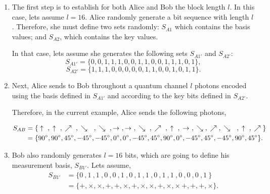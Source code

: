 \begin{enumerate}
  \item The first step is to establish for both Alice and Bob the block length $l$. In this case, lets assume $l=16$. Alice randomly generate a bit sequence with length $l$.
      Therefore, she must define two sets randomly: $S_{A1}$ which contains the basis values; and $S_{A2}$, which contains the key values.

      In that case, lets assume she generates the following sets $S_{A1'}$ and $S_{A2'}$:
      $$S_{A1'} = \{0,0,1,1,1,0,0,1,1,0,0,1,1,1,0,1 \},$$
      $$S_{A2'} = \{1,1,1,0,0,0,0,0,1,1,0,0,1,0,1,1 \}.$$

  \item Next, Alice sends to Bob throughout a quantum channel $l$ photons encoded using the basis defined in $S_{A1'}$ and according to the key bits defined in $S_{A2'}$.

      Therefore, in the current example, Alice sends the following photons,

      \begin{align*}
        S_{AB} & = \{\space { }\uparrow \ \space { }\space { },\space { }\uparrow \ \space { }\space { }, \space { }\nearrow \ \space { }\space { },\space { } \searrow \ \space { }\space { } \ , \space { }\searrow \ \space { }\space { }, \to \ , \to \ ,\space { } \searrow \ \space { }\space { },\space { } \nearrow \ \space { },\space { }\uparrow \ \space { }\space { }, \space { }\to \ ,\space { } \searrow\space { }\space { },\space { }\nearrow\space { }\space { },\space { }\searrow \ \ \space { }\space { },\space { }\uparrow \ \space { }\space { },\space { }\nearrow \space { }\space { }\} \\
          & =\{90^{\circ},90^{\circ}, 45^{\circ}, -45^{\circ},-45^{\circ}, 0^{\circ}, 0^{\circ}, -45^{\circ}, 45^{\circ},90^{\circ}, 0^{\circ}, -45^{\circ}, 45^{\circ}, -45^{\circ}, 90^{\circ}, 45^{\circ} \}.
        \label{eq:photonsalice}
      \end{align*}


  \item Bob also randomly generates $l=16$ bits, which are going to define his measurement basis, $S_{B1'}$. Lets assume,
        \begin{align*}
             S_{B1'} & = \{0 \ ,1 \ ,1 \ ,0 \ ,0 \ ,1 \ ,0 \ ,1 \ ,1 \ ,0 \ ,1 \ ,1 \ ,0 \ ,0 \ ,0 \ ,1 \  \} \\
                    & = \{ +,\times,\times,+,+,\times,+,\times, \times,+, \times, \times \,+,+,+,\times \}.
        \end{align*}


\end{enumerate}
